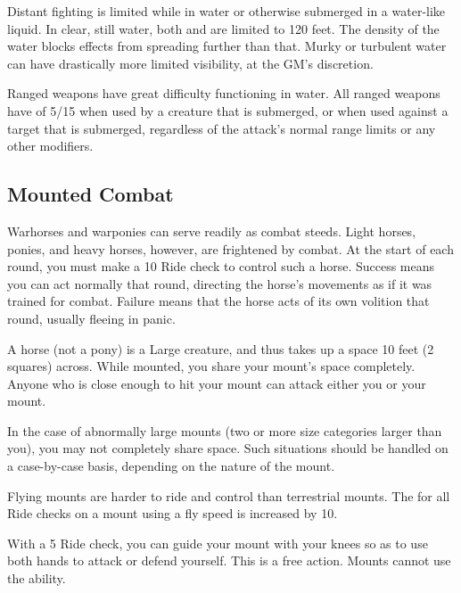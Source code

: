     Distant fighting is limited while in water or otherwise submerged in a water-like liquid.
    In clear, still water, both  and  are limited to 120 feet.
    The density of the water blocks effects from spreading further than that.
    Murky or turbulent water can have drastically more limited visibility, at the GM's discretion.

    Ranged weapons have great difficulty functioning in water.
    All ranged weapons have  of 5/15 when used by a creature that is submerged, or when used against a target that is submerged, regardless of the attack's normal range limits or any other modifiers.

  \subsection{Mounted Combat}\label{Mounted Combat}
     Warhorses and warponies can serve readily as combat steeds. Light horses, ponies, and heavy horses, however, are frightened by combat.
    At the start of each round, you must make a  10 Ride check to control such a horse.
    Success means you can act normally that round, directing the horse's movements as if it was trained for combat.
    Failure means that the horse acts of its own volition that round, usually fleeing in panic.

     A horse (not a pony) is a Large creature, and thus takes up a space 10 feet (2 squares) across. While mounted, you share your mount's space completely. Anyone who is close enough to hit your mount can attack either you or your mount.

    In the case of abnormally large mounts (two or more size categories larger than you), you may not completely share space. Such situations should be handled on a case-by-case basis, depending on the nature of the mount.

     Flying mounts are harder to ride and control than terrestrial mounts.
    The  for all Ride checks on a mount using a fly speed is increased by 10.

     With a  5 Ride check, you can guide your mount with your knees so as to use both hands to attack or defend yourself.
    This is a free action.
    Mounts cannot use the  ability.

